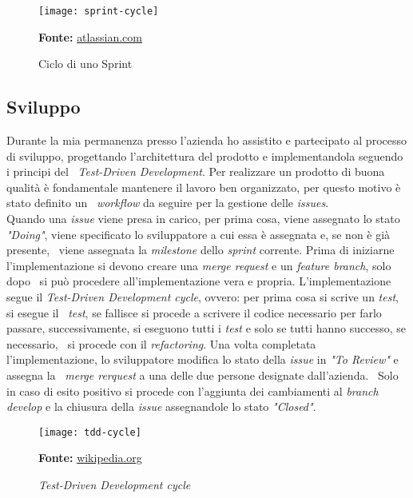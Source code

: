 \begin{figure}[!ht]
  \begin{center}
    \texttt{[image: sprint-cycle]}
    \caption{Ciclo di uno Sprint}
    \textbf{Fonte:} \href{https://www.atlassian.com}{atlassian.com}
  \end{center}
\end{figure}

\subsection{Sviluppo}
Durante la mia permanenza presso l'azienda ho assistito e partecipato al processo di sviluppo, progettando l'architettura del prodotto e implementandola seguendo i principi del \
\emph{Test-Driven Development}. Per realizzare un prodotto di buona qualità è fondamentale mantenere il lavoro ben organizzato, per questo motivo è stato definito un \
\emph{workflow} da seguire per la gestione delle \emph{issues}. \\

Quando una \emph{issue} viene presa in carico, per prima cosa, viene assegnato lo stato \emph{"Doing"}, viene specificato lo sviluppatore a cui essa è assegnata e, se non è già presente, \
viene assegnata la \emph{milestone} dello \emph{sprint} corrente. Prima di iniziarne l'implementazione si devono creare una \emph{merge request} e un \emph{feature branch}, solo dopo \
si può procedere all'implementazione vera e propria. L'implementazione segue il \emph{Test-Driven Development cycle}, ovvero: per prima cosa si scrive un \emph{test}, si esegue il \
\emph{test}, se fallisce si procede a scrivere il codice necessario per farlo passare, successivamente, si eseguono tutti i \emph{test} e solo se tutti hanno successo, se necessario, \
si procede con il \emph{refactoring}. Una volta completata l'implementazione, lo sviluppatore modifica lo stato della \emph{issue} in \emph{"To Review"} e assegna la \
\emph{merge rerquest} a una delle due persone designate dall'azienda. \
Solo in caso di esito positivo si procede con l'aggiunta dei cambiamenti al \emph{branch develop} e la chiusura della \emph{issue} assegnandole lo stato \emph{"Closed"}.

\begin{figure}[!ht]
  \begin{center}
    \texttt{[image: tdd-cycle]}
    \caption{\emph{Test-Driven Development cycle}}
    \textbf{Fonte:} \href{https://www.wikipedia.org}{wikipedia.org}
  \end{center}
\end{figure}

